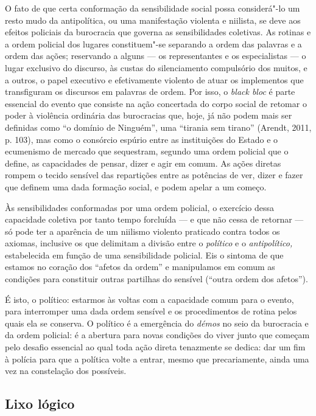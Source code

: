 O fato de que certa conformação da sensibilidade social possa
considerá"-lo um resto mudo da antipolítica, ou uma manifestação violenta
e niilista, se deve aos efeitos policiais da burocracia que governa as
sensibilidades coletivas. As rotinas e a ordem policial dos lugares
constituem"-se separando a ordem das palavras e a ordem das ações;
reservando a alguns --- os representantes e os especialistas --- o lugar
exclusivo do discurso, às custas do silenciamento compulsório dos
muitos, e a outros, o papel executivo e efetivamente violento de atuar
os implementos que transfiguram os discursos em palavras de ordem. Por
isso, o \emph{black bloc} é parte essencial do evento que consiste na
ação concertada do corpo social de retomar o poder à violência ordinária
das burocracias que, hoje, já não podem mais ser definidas como ``o
domínio de Ninguém'', uma ``tirania sem tirano'' (Arendt, 2011, p. 103),
mas como o consórcio espúrio entre as instituições do Estado e o
ecumenismo de mercado que sequestram, segundo uma ordem policial que o
define, as capacidades de pensar, dizer e agir em comum. As ações
diretas rompem o tecido sensível das repartições entre as potências de
ver, dizer e fazer que definem uma dada formação social, e podem apelar
a um começo.

Às sensibilidades conformadas por uma ordem policial, o exercício dessa
capacidade coletiva por tanto tempo forcluída --- e que não cessa de
retornar --- só pode ter a aparência de um niilismo violento praticado
contra todos os axiomas, inclusive os que delimitam a divisão entre o
\emph{político }e o\emph{ antipolítico,} estabelecida em função de uma
sensibilidade policial. Eis o sintoma de que estamos no coração dos
``afetos da ordem'' e manipulamos em comum as condições para constituir
outras partilhas do sensível (``outra ordem dos afetos'').

É isto, o político: estarmos às voltas com a capacidade comum para o
evento, para interromper uma dada ordem sensível e os procedimentos de
rotina pelos quais ela se conserva. O político é a emergência do
\emph{démos} no seio da burocracia e da ordem policial: é a abertura
para novas condições do viver junto que começam pelo desafio essencial
ao qual toda ação direta tenazmente se dedica: dar um fim à polícia para
que a política volte a entrar, mesmo que precariamente, ainda uma vez na
constelação dos possíveis.

\subsection{Lixo lógico}

